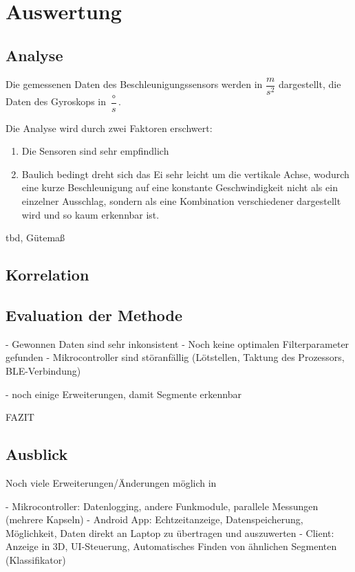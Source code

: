\section{Auswertung}
\subsection{Analyse}
Die gemessenen Daten des Beschleunigungssensors werden in $\dfrac{m}{s^{2}}$ 
dargestellt, die Daten des Gyroskops in $\dfrac{\circ}{s}$.

Die Analyse wird durch zwei Faktoren erschwert:
\begin{enumerate}
	\item Die Sensoren sind sehr empfindlich
	\item Baulich bedingt dreht sich das Ei sehr leicht um die vertikale Achse, wodurch eine kurze Beschleunigung auf eine konstante Geschwindigkeit nicht als ein einzelner Ausschlag, sondern als eine Kombination verschiedener dargestellt wird und so kaum erkennbar ist.
\end{enumerate}


tbd,  Gütemaß

\subsection{Korrelation}


\subsection{Evaluation der Methode}
 
- Gewonnen Daten sind sehr inkonsistent
- Noch keine optimalen Filterparameter gefunden
- Mikrocontroller sind störanfällig (Lötstellen, Taktung des Prozessors, BLE-Verbindung)

- noch einige Erweiterungen, damit Segmente erkennbar

FAZIT

\subsection{Ausblick}

Noch viele Erweiterungen/Änderungen möglich in

- Mikrocontroller: Datenlogging, andere Funkmodule, parallele Messungen (mehrere Kapseln)
- Android App: Echtzeitanzeige, Datenspeicherung, Möglichkeit, Daten direkt an Laptop zu übertragen und auszuwerten
- Client: Anzeige in 3D, UI-Steuerung, Automatisches Finden von ähnlichen Segmenten (Klassifikator)

